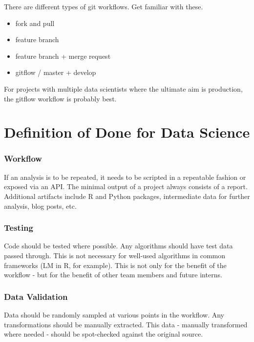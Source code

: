 \documentclass[
  11pt,
]{book}
\providecommand{\tightlist}{%
  \setlength{\itemsep}{0pt}\setlength{\parskip}{0pt}}
\begin{document}
There are different types of git workflows. Get familiar with these.

\begin{itemize}
\tightlist
\item
  fork and pull
\item
  feature branch
\item
  feature branch + merge request
\item
  gitflow / master + develop
\end{itemize}

For projects with multiple data scientists where the ultimate aim is production, the gitflow workflow is probably best.

\hypertarget{definition-of-done-for-data-science}{%
\chapter{Definition of Done for Data Science}\label{definition-of-done-for-data-science}}

\hypertarget{workflow}{%
\subsection{Workflow}\label{workflow}}

If an analysis is to be repeated, it needs to be scripted in a repeatable fashion or exposed via an API. The minimal output of a project always consists of a report. Additional artifacts include R and Python packages, intermediate data for further analysis, blog posts, etc.

\hypertarget{testing}{%
\subsection{Testing}\label{testing}}

Code should be tested where possible. Any algorithms should have test data passed through. This is not necessary for well-used algorithms in common frameworks (LM in R, for example). This is not only for the benefit of the workflow - but for the benefit of other team members and future interns.

\hypertarget{data-validation}{%
\subsection{Data Validation}\label{data-validation}}

Data should be randomly sampled at various points in the workflow. Any transformations should be manually extracted. This data - manually transformed where needed - should be spot-checked against the original source.
\end{document}
